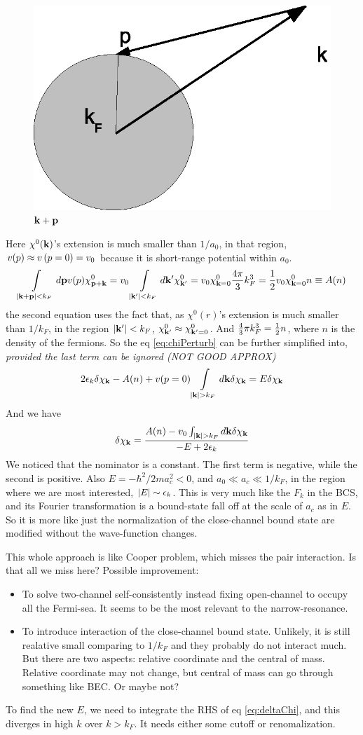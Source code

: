 \begin{figure}[hbt]
\centering
\includegraphics[width=.30\textwidth]{image/k+pVec.eps}
\caption{$\mathbf{k}+\mathbf{p}$}
\label{fig:k+pVec}
\end{figure}
Here $\chi^0(\mathbf{k})$'s extension is much smaller than $1/a_0$, in that region, $v(p)\approx{}v\left(p=0\right)=v_0$ because it is short-range potential within $a_0$.  
\[
\int\limits_{\lvert{\ensuremath{\mathbf{k}}+\ensuremath{\mathbf{p}}}\rvert<k_F}d\mathbf{p}{}v(p)\chi^0_{\mathbf{p}+\mathbf{k}}=v_0\int\limits_{\lvert{\ensuremath{\mathbf{k}}'}\rvert<k_F}d\mathbf{k}'{}\chi^0_{\mathbf{k}'}=v_0\chi^0_{\mathbf{k}=0}\frac{4\pi}{3}k_F^3=\frac{1}{2}v_0\chi^0_{\mathbf{k}=0}n\equiv{}A(n)
\]
the second equation uses the fact that, as $\chi^0(r)$'s extension is much smaller than $1/k_F$, in the region $\lvert{\ensuremath{\mathbf{k}}'}\rvert<k_F$, $\chi^0_{\mathbf{k}'}\approx\chi^0_{\mathbf{k}'=0}$.  And $\frac{4}{3}\pi{}k_F^3=\frac{1}{2}n$, where $n$ is the density of the fermions. So the eq \eqref{eq:chiPerturb} can be further simplified into, \emph{provided the last term can be ignored (NOT GOOD APPROX)} 
\[
2\epsilon_k\delta\chi_{\mathbf{k}}-A(n)+v(p=0)\int\limits_{\lvert{\ensuremath{\mathbf{k}}}\rvert>k_F}d\mathbf{k}{}\delta\chi_{\mathbf{k}}=E\delta\chi_{\mathbf{k}}
\]
And we have 
\begin{equation}\label{eq:deltaChi}
\delta\chi_{\mathbf{k}}=\frac{A(n)-v_0\int_{\lvert{\ensuremath{\mathbf{k}}}\rvert>k_F}d\mathbf{k}{}\delta\chi_{\mathbf{k}}}{-E+2\epsilon_k}
\end{equation}
We noticed that the nominator is a constant.  The first term is negative, while the second is positive.  Also $E=-\hbar^2/{2ma_c^2}<0$, and $a_0\ll{}a_c\ll{}1/{k_F}$, in the region where we are most interested, $\lvert{E}\rvert\sim\epsilon_k$.  This is very much like the $F_k$ in the BCS, and its Fourier transformation is a bound-state fall off at the scale of $a_c$ as in $E$. So it is more like just the normalization of the close-channel bound state are modified without the wave-function changes. 

This whole approach is like Cooper problem, which misses the pair interaction.  Is that all we miss here? Possible improvement:
\begin{itemize}
 	\item To solve two-channel self-consistently instead fixing open-channel to occupy all the Fermi-sea. It seems to be the most relevant to the narrow-resonance.
 	\item To introduce interaction of the close-channel bound state.  Unlikely, it is still realative small comparing to $1/k_F$ and they probably do not interact much. But there are two aspects:  relative coordinate and the central of mass.  Relative coordinate may not change, but central of mass can go through something like BEC.  Or maybe not? 
 	   
 \end{itemize} 
To find the new $E$, we need to integrate the RHS of eq \eqref{eq:deltaChi}, and this diverges in high $k$ over $k>k_F$.  It needs either some cutoff or renomalization.  

